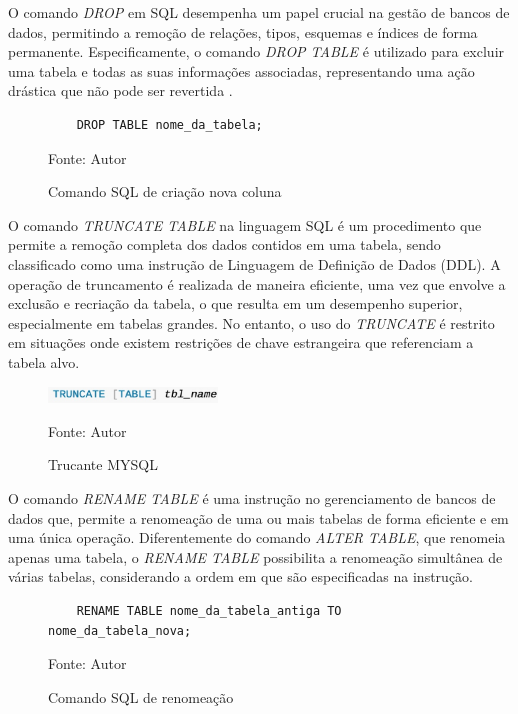 
O comando \textit{DROP} em SQL desempenha um papel crucial na gestão de bancos de dados, permitindo a remoção de relações, tipos, esquemas e índices de forma permanente. Especificamente, o comando \textit{DROP TABLE} é utilizado para excluir uma tabela e todas as suas informações associadas, representando uma ação drástica que não pode ser revertida \cite{silberschatz2011database}.

\begin{figure}[H]
    \centering
    \begin{lstlisting}
    DROP TABLE nome_da_tabela;
    \end{lstlisting}
    \caption{Comando SQL de criação nova coluna }
    Fonte: Autor
    \label{lst:sql_drop}
\end{figure}


O comando \textit{TRUNCATE TABLE} na linguagem SQL é um procedimento que permite a remoção completa dos dados contidos em uma tabela, sendo classificado como uma instrução de Linguagem de Definição de Dados (DDL). A operação de truncamento é realizada de maneira eficiente, uma vez que envolve a exclusão e recriação da tabela, o que resulta em um desempenho superior, especialmente em tabelas grandes. No entanto, o uso do \textit{TRUNCATE} é restrito em situações onde existem restrições de chave estrangeira que referenciam a tabela alvo.\cite{mySQL2025}

\begin{figure}[H]
    \centering
    \includegraphics[width=0.4\textwidth]{figuras/truncate_mysql.eps}
    \caption{Trucante MYSQL}
    Fonte: Autor
    \label{fig:truncate}
\end{figure}



O comando \textit{RENAME TABLE} é uma instrução no gerenciamento de bancos de dados que, permite a renomeação de uma ou mais tabelas de forma eficiente e em uma única operação. Diferentemente do comando \textit{ALTER TABLE}, que renomeia apenas uma tabela, o \textit{RENAME TABLE} possibilita a renomeação simultânea de várias tabelas, considerando a ordem em que são especificadas na instrução. 

\begin{figure}[H]
    \centering
    \begin{lstlisting}
    RENAME TABLE nome_da_tabela_antiga TO nome_da_tabela_nova;
    \end{lstlisting}
    \caption{Comando SQL de renomeação}
    Fonte: Autor
    \label{lst:sql_rename}
\end{figure}

